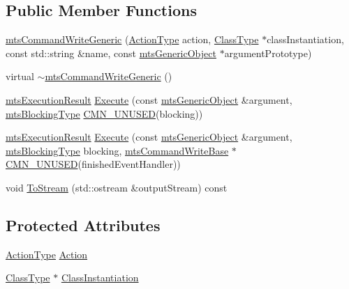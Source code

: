 \subsection*{Public Member Functions}
\begin{DoxyCompactItemize}
\item 
\hyperlink{classmts_command_write_generic_a756523d52f33b00d0591f4dc88869059}{mts\-Command\-Write\-Generic} (\hyperlink{classmts_command_write_generic_abb623932928545068e6df1074d9990e9}{Action\-Type} action, \hyperlink{classmts_command_write_generic_ab4ffe009b7558cff08d309ba7dfb1235}{Class\-Type} $\ast$class\-Instantiation, const std\-::string \&name, const \hyperlink{classmts_generic_object}{mts\-Generic\-Object} $\ast$argument\-Prototype)
\item 
virtual \hyperlink{classmts_command_write_generic_a83dcabde23ba9c1f67af37643ebb4638}{$\sim$mts\-Command\-Write\-Generic} ()
\item 
\hyperlink{classmts_execution_result}{mts\-Execution\-Result} \hyperlink{classmts_command_write_generic_a00ebcfefb63ba9751f70bacb93d77cd6}{Execute} (const \hyperlink{classmts_generic_object}{mts\-Generic\-Object} \&argument, \hyperlink{mts_forward_declarations_8h_ad7426ccb6c883bc780d0ee197dddcbe7}{mts\-Blocking\-Type} \hyperlink{cmn_portability_8h_a021894e2626935fa2305434b1e893ff6}{C\-M\-N\-\_\-\-U\-N\-U\-S\-E\-D}(blocking))
\item 
\hyperlink{classmts_execution_result}{mts\-Execution\-Result} \hyperlink{classmts_command_write_generic_a7cfd8681dcf0ee2effc60c5c1f61c5c3}{Execute} (const \hyperlink{classmts_generic_object}{mts\-Generic\-Object} \&argument, \hyperlink{mts_forward_declarations_8h_ad7426ccb6c883bc780d0ee197dddcbe7}{mts\-Blocking\-Type} blocking, \hyperlink{classmts_command_write_base}{mts\-Command\-Write\-Base} $\ast$\hyperlink{cmn_portability_8h_a021894e2626935fa2305434b1e893ff6}{C\-M\-N\-\_\-\-U\-N\-U\-S\-E\-D}(finished\-Event\-Handler))
\item 
void \hyperlink{classmts_command_write_generic_aac58e354ab9ce4e1e088bb3089093521}{To\-Stream} (std\-::ostream \&output\-Stream) const 
\end{DoxyCompactItemize}
\subsection*{Protected Attributes}
\begin{DoxyCompactItemize}
\item 
\hyperlink{classmts_command_write_generic_abb623932928545068e6df1074d9990e9}{Action\-Type} \hyperlink{classmts_command_write_generic_ac0a7ab9bf5bf14479f46d2f32a259de6}{Action}
\item 
\hyperlink{classmts_command_write_generic_ab4ffe009b7558cff08d309ba7dfb1235}{Class\-Type} $\ast$ \hyperlink{classmts_command_write_generic_a9417d03cc4cc313622021ba6a94f1994}{Class\-Instantiation}
\end{DoxyCompactItemize}
